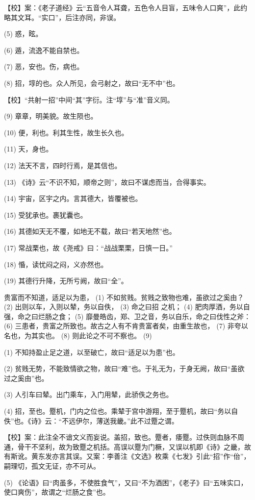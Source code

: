 \documentclass[12pt,UTF8]{ctexbook}
\begin{document}
【校】案：《老子道经》云“五音令人耳聋，五色令人目盲，五味令人口爽”，此约略其文耳。“实口”，后注亦同，非误。

(5) 惑，眩。

(6) 遁，流逸不能自禁也。

(7) 恶，安也。伤，病也。

(8) 招，埻的也。众人所见，会弓射之，故曰“无不中”也。

【校】“共射一招”中间“其”字衍。注“埻”与“准”音义同。

(9) 章章，明美貌。故生陨也。

(10) 便，利也。利其生性，故生长久也。

(11) 天，身也。

(12) 法天不言，四时行焉，是其信也。

(13) 《诗》云“不识不知，顺帝之则”，故曰不谋虑而当，合得事实。

(14) 宇宙，区宇之内。言其德大，皆覆被也。

(15) 受犹承也。裹犹囊也。

(16) 其德如天无不覆，如地无不载，故曰“若天地然”也。

(17) 常战栗也，故《尧戒》曰：“战战栗栗，日慎一日。”

(18) 惛，读忧闷之闷，义亦然也。

(19) 其德行升降，无所亏阙，故曰“全”。

贵富而不知道，适足以为患， (1) 不如贫贱。贫贱之致物也难，虽欲过之奚由？ (2) 出则以车，入则以辇，务以自佚， (3) 命之曰招 之机； (4) 肥肉厚酒，务以自强，命之曰烂肠之食； (5) 靡曼皓齿，郑、卫之音，务以自乐，命之曰伐性之斧： (6) 三患者，贵富之所致也。故古之人有不肯贵富者矣，由重生故也， (7) 非夸以名也，为其实也。 (8) 则此论之不可不察也。 (9)

(1) 不知持盈止足之道，以至破亡，故曰“适足以为患”也。

(2) 贫贱无势，不能致情欲之物，故曰“难”也。于礼无为，于身无阙，故曰“虽欲过之奚由”也。

(3) 人引车曰辇。出门乘车，入门用辇，此骄佚之务也。

(4) 招，至也。蹷机，门内之位也。乘辇于宫中游翔，至于蹷机，故曰“务以自佚”也。《诗》云：“不远伊尔，薄送我畿。”此不过蹷之谓。

【校】案：此注全不谙文义而妄说。盖招，致也。蹷者，痿蹷。过佚则血脉不周通，骨干不坚利，故为致蹷之机括。高误以蹷为门橛，又误以机即《诗》之畿，故有斯讹。黄东发亦言其误。又案：李善注《文选》枚乘《七发》引此“招”作“佁”，嗣理切，孤文无证，亦不可从。

(5) 《论语》曰“肉虽多，不使胜食气”，又曰“不为酒困”，《老子》曰“五味实口，使口爽伤”，故谓之“烂肠之食”也。
\end{document}
